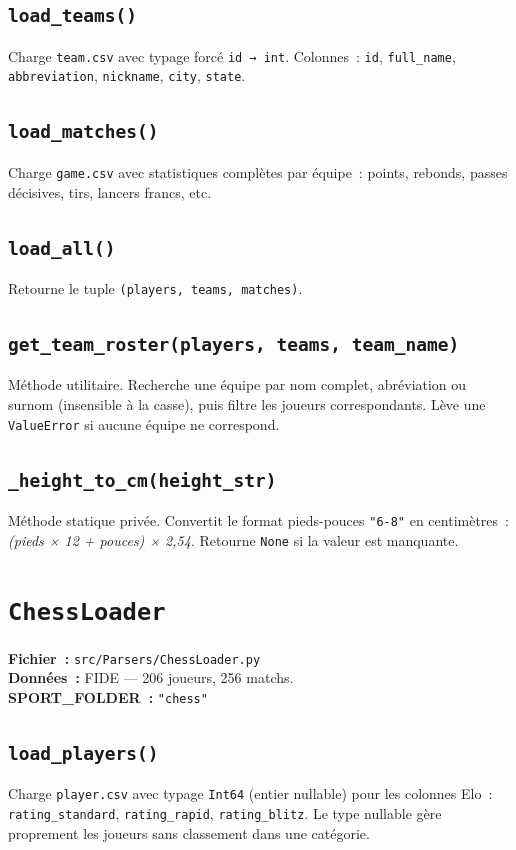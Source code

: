 \documentclass[12pt,a4paper]{article}
\begin{document}
\subsection{\texttt{load\_teams()}}
Charge \texttt{team.csv} avec typage forcé \texttt{id → int}. Colonnes~:
\texttt{id}, \texttt{full\_name}, \texttt{abbreviation}, \texttt{nickname},
\texttt{city}, \texttt{state}.

\subsection{\texttt{load\_matches()}}
Charge \texttt{game.csv} avec statistiques complètes par équipe~: points,
rebonds, passes décisives, tirs, lancers francs, etc.

\subsection{\texttt{load\_all()}}
Retourne le tuple \texttt{(players, teams, matches)}.

\subsection{\texttt{get\_team\_roster(players, teams, team\_name)}}
Méthode utilitaire. Recherche une équipe par nom complet, abréviation ou surnom
(insensible à la casse), puis filtre les joueurs correspondants.
Lève une \texttt{ValueError} si aucune équipe ne correspond.

\subsection{\texttt{\_height\_to\_cm(height\_str)}}
Méthode statique privée. Convertit le format pieds-pouces \texttt{"6-8"} en
centimètres~: \textit{(pieds × 12 + pouces) × 2,54}. Retourne \texttt{None}
si la valeur est manquante.

\section{\texttt{ChessLoader}}

\textbf{Fichier~:} \texttt{src/Parsers/ChessLoader.py}\\
\textbf{Données~:} FIDE — 206 joueurs, 256 matchs.\\
\textbf{SPORT\_FOLDER~:} \texttt{"chess"}

\subsection{\texttt{load\_players()}}
Charge \texttt{player.csv} avec typage \texttt{Int64} (entier nullable) pour les
colonnes Elo~: \texttt{rating\_standard}, \texttt{rating\_rapid},
\texttt{rating\_blitz}. Le type nullable gère proprement les joueurs sans
classement dans une catégorie.
\end{document}
